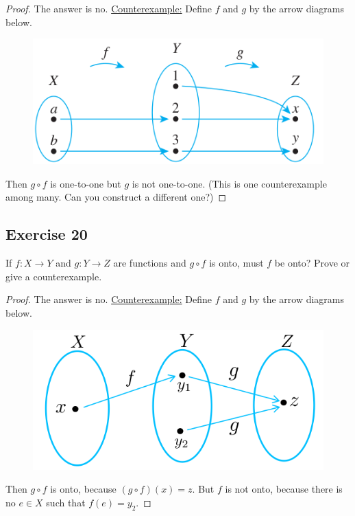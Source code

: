 \documentclass[14pt]{extarticle}
\begin{document}
\begin{proof}
The answer is no. \underline{Counterexample:} Define $f$ and $g$ by the arrow diagrams below.

\begin{figure}[ht!]
\centering
\includegraphics[scale=0.4]{../images/7.3.19.png}
\end{figure}

Then \(g \circ f\) is one-to-one but $g$ is not one-to-one. 
(This is one counterexample among many. Can you construct a different one?)
\end{proof}

\subsection{Exercise 20}
If \(f: X \to Y\) and \(g: Y \to Z\) are functions and \(g \circ f\) is onto, must $f$ be onto? 
Prove or give a counterexample.

\begin{proof}
The answer is no. \underline{Counterexample:} Define $f$ and $g$ by the arrow diagrams below.

\begin{figure}[ht!]
\centering
\includegraphics[scale=0.4]{../images/7.3.20.png}
\end{figure}

Then \(g \circ f\) is onto, because \((g \circ f)(x) = z\). But $f$ is not onto, because there is no \(e \in X\) such 
that \(f(e) = y_2\).
\end{proof}
\end{document}
